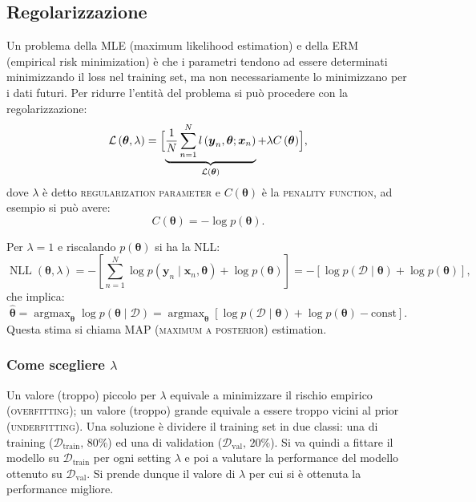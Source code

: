 \documentclass[10pt]{article}
\DeclareMathOperator*{\argmax}{argmax}
\DeclareMathOperator{\NLL}{NLL}
\renewcommand{\vec}[1]{\boldsymbol{#1}}
\newcommand{\im}[1]{\textsc{#1}}
\newcommand{\cond}{\mid}
\newcommand{\pare}[1]{
	\ensuremath{\left(#1\right)}
}
\newcommand{\spare}[1]{
	\ensuremath{\left[#1\right]}
}
\theoremstyle{definition}
\begin{document}
\subsection{Regolarizzazione}
Un problema della MLE (maximum likelihood estimation) e della ERM (empirical risk minimization) è che i parametri tendono ad essere determinati minimizzando il loss nel training set, ma non necessariamente lo minimizzano per i dati futuri. Per ridurre l'entità del problema si può procedere con la regolarizzazione:
\begin{equation}
\mathcal{L}\pare{\vec{\theta}, \lambda} = \Bigl[ \underbrace{\frac{1}{N}\sum_{n=1}^N l\pare{\vec{y}_n, \vec{\theta}; \vec{x}_n}}_{\mathcal{L}\pare{\vec{\theta}}} + \lambda C\pare{\vec{\theta}} \Bigr],
\end{equation}
dove $\lambda$ è detto \im{regularization parameter} e $C\pare{\vec{\theta}}$ è la \im{penality function}, ad esempio si può avere:
\[
C\pare{\vec{\theta}} = -\log{p\pare{\vec{\theta}}}.
\]

Per \(\lambda = 1\) e riscalando \(p\pare{\vec{\theta}}\) si ha la NLL:
\begin{equation}
\NLL\pare{\vec{\theta}, \lambda} = - \spare{\sum_{n=1}^N\log{p\pare{\vec{y}_n\cond\vec{x}_n,\vec{\theta}}} + \log{p\pare{\vec{\theta}}}} = -\spare{\log{p\pare{\mathcal{D}\cond\vec{\theta}}} + \log{p\pare{\vec{\theta}}}},
\end{equation}
che implica:
\begin{equation}
\hat{\vec{\theta}} = \argmax_{\vec{\theta}}\log{p\pare{\vec{\theta}\cond\mathcal{D}}} = \argmax_{\vec{\theta}}\spare{\log{p\pare{\mathcal{D}\cond\vec{\theta}}} + \log{p\pare{\vec{\theta}}} - \text{const}}.
\end{equation}
Questa stima si chiama MAP (\im{maximum a posterior}) estimation.


\subsubsection{Come scegliere \(\lambda\)}
Un valore (troppo) piccolo per \(\lambda\) equivale a minimizzare il rischio empirico (\im{overfitting}); un valore (troppo) grande equivale a essere troppo vicini al prior (\im{underfitting}). Una soluzione è dividere il training set in due classi: una di training ($\mathcal{D}_{\text{train}},\,80\%$) ed una di validation ($\mathcal{D}_{\text{val}},\,20\%$). Si va quindi a fittare il modello su $\mathcal{D}_{\text{train}}$ per ogni setting $\lambda$ e poi a valutare la performance del modello ottenuto su $\mathcal{D}_{\text{val}}$. Si prende dunque il valore di $\lambda$ per cui si è ottenuta la performance migliore.
\end{document}
